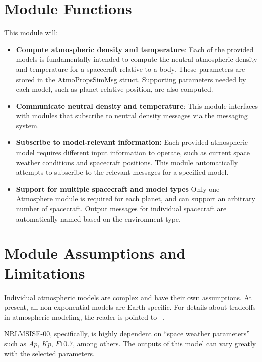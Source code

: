 

\section{Module Functions}
This module will:
\begin{itemize}
	\item \textbf{Compute atmospheric density and temperature}: Each of the provided models is fundamentally intended to compute the neutral atmospheric density and temperature for a spacecraft relative to a body. These parameters are stored in the AtmoPropsSimMsg struct. Supporting parameters needed by each model, such as planet-relative position, are also computed.
	\item \textbf{Communicate neutral density and temperature}: This module interfaces with modules that subscribe to neutral density messages via the messaging system.
	\item \textbf {Subscribe to model-relevant information:} Each provided atmospheric model requires different input information to operate, such as current space weather conditions and spacecraft positions. This module automatically attempts to subscribe to the relevant messages for a specified model. 
	\item \textbf{Support for multiple spacecraft and model types} Only one Atmosphere module is required for each planet, and can support an arbitrary number of spacecraft. Output messages for individual spacecraft are automatically named based on the environment type.
\end{itemize}

\section{Module Assumptions and Limitations}
Individual atmospheric models are complex and have their own assumptions. At present, all non-exponential models are Earth-specific. For details about tradeoffs in atmospheric modeling, the reader is pointed to ~. 

NRLMSISE-00, specifically, is highly dependent on ``space weather parameters'' such as $Ap$, $Kp$, $F10.7$, among others. The outputs of this model can vary greatly with the selected parameters.